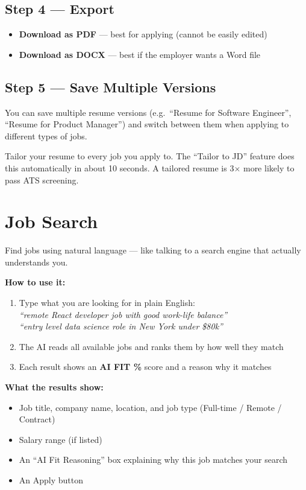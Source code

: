 \documentclass[12pt, a4paper]{report}
\begin{document}
\subsection{Step 4 --- Export}

\begin{itemize}
  \item \textbf{Download as PDF} --- best for applying (cannot be easily edited)
  \item \textbf{Download as DOCX} --- best if the employer wants a Word file
\end{itemize}

\subsection{Step 5 --- Save Multiple Versions}

You can save multiple resume versions (e.g.\ ``Resume for Software Engineer'',
``Resume for Product Manager'') and switch between them when applying to
different types of jobs.

\begin{tipbox}
Tailor your resume to every job you apply to.  The ``Tailor to JD'' feature does
this automatically in about 10 seconds.  A tailored resume is 3$\times$ more
likely to pass ATS screening.
\end{tipbox}

\section{Job Search}

Find jobs using natural language --- like talking to a search engine that actually
understands you.

\textbf{How to use it:}
\begin{enumerate}
  \item Type what you are looking for in plain English:\\
        \emph{``remote React developer job with good work-life balance''}\\
        \emph{``entry level data science role in New York under \$80k''}
  \item The AI reads all available jobs and ranks them by how well they match
  \item Each result shows an \textbf{AI FIT \%} score and a reason why it matches
\end{enumerate}

\textbf{What the results show:}
\begin{itemize}
  \item Job title, company name, location, and job type (Full-time / Remote / Contract)
  \item Salary range (if listed)
  \item An ``AI Fit Reasoning'' box explaining why this job matches your search
  \item An Apply button
\end{itemize}
\end{document}

